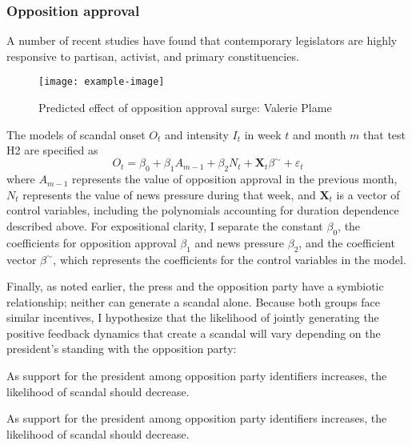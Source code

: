 \documentclass{cupjournal}
\begin{document}
\subsubsection{Opposition approval}
A number of recent studies have found that contemporary legislators are
highly responsive to partisan, activist, and primary
constituencies.

\begin{figure}[!t]
\label{bushsurge}
\centering
\texttt{[image: example-image]}

\caption{Predicted effect of opposition approval surge: Valerie Plame}

\end{figure}

The models of scandal onset $O_t$ and intensity $I_t$ in week $t$ and month $m$ that test H2 are specified as
\begin{equation}
\label{secondstage}
O_t = \beta_0 + \beta_1 A_{m-1} + \beta_2 N_{t} + \textbf{X}_t \beta^{\sim}  + \varepsilon_t
\end{equation}
where $A_{m-1}$ represents the value of opposition approval in the previous month, $N_{t}$ represents the value of news pressure during that week, and $\textbf{X}_t$ is a vector of control variables, including the polynomials accounting for duration dependence described above. For expositional clarity, I separate the constant $\beta_0$, the coefficients for opposition approval $\beta_1$ and news pressure $\beta_2$, and the coefficient vector $\beta^{\sim}$, which represents the coefficients for the control variables in the model.

Finally, as noted earlier, the press and the opposition party have a symbiotic relationship; neither can generate a scandal alone. Because both groups face similar incentives, I hypothesize that the likelihood of jointly generating the positive feedback dynamics that create a scandal will vary depending on the president's standing with the opposition party:

\begin{hypolist}
\item As support for the president among opposition party identifiers increases, the likelihood of scandal should decrease.
\item As support for the president among opposition party identifiers increases, the likelihood of scandal should decrease.
\end{hypolist}
\end{document}
